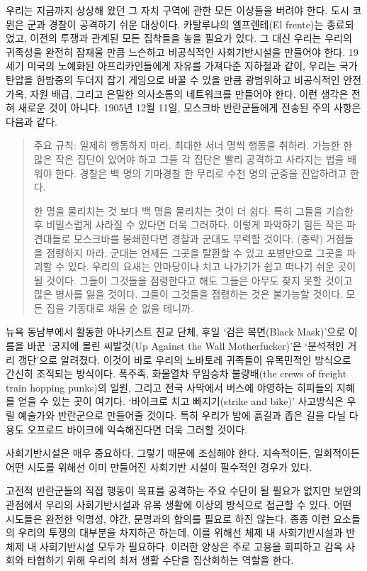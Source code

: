 \documentclass[10pt, b6paper, openany]{memoir}
\begin{document}
\begin{article}
우리는 지금까지 상상해 왔던 그 자치 구역에 관한 모든 이상들을 버려야 한다. 도시 코뮌은 군과 경찰이 공격하기 쉬운 대상이다. 카탈루냐의 엘프렌테(El frente)는 종료되었고, 이전의 투쟁과 관계된 모든 집착들을 놓을 필요가 있다. 그 대신 우리는 우리의 귀족성을 완전히 잠재울 만큼 느슨하고 비공식적인 사회기반시설을 만들어야 한다. 19세기 미국의 노예화된 아프리카인들에게 자유를 가져다준 지하철과 같이, 우리는 국가 탄압을 한밤중의 두더지 잡기 게임으로 바꿀 수 있을 만큼 광범위하고 비공식적인 안전가옥, 자원 배급, 그리고 은밀한 의사소통의 네트워크를 만들어야 한다. 이런 생각은 전혀 새로운 것이 아니다. 1905년 12월 11일, 모스크바 반란군들에게 전송된 주의 사항은 다음과 같다. 

\begin{quote}
주요 규칙: 일제히 행동하지 마라. 최대한 서너 명씩 행동을 취하라. 가능한 한 많은 작은 집단이 있어야 하고 그들 각 집단은 빨리 공격하고 사라지는 법을 배워야 한다. 경찰은 백 명의 기마경찰 한 무리로 수천 명의 군중을 진압하려고 한다.

한 명을 물리치는 것 보다 백 명을 물리치는 것이 더 쉽다. 특히 그들을 기습한 후 비밀스럽게 사라질 수 있다면 더욱 그러하다. 이렇게 파악하기 힘든 작은 파견대들로 모스크바를 봉쇄한다면 경찰과 군대도 무력할 것이다. (중략) 거점들을 점령하지 마라. 군대는 언제든 그곳을 탈환할 수 있고 포병만으로 그곳을 파괴할 수 있다. 우리의 요새는 안마당이나 치고 나가기가 쉽고 떠나기 쉬운 곳이 될 것이다. 그들이 그것들을 점령한다고 해도 그들은 아무도 찾지 못할 것이고 많은 병사를 잃을 것이다. 그들이 그것들을 점령하는 것은 불가능할 것이다. 모든 집을 기동대로 채울 순 없을 테니까. 
\end{quote}

뉴욕 동남부에서 활동한 아나키스트 친교 단체, 후일 `검은 복면(Black Mask)'으로 이름을 바꾼 `궁지에 몰린 씨발것(Up Against the Wall Motherfucker)'은 `분석적인 거리 갱단'으로 알려졌다. 이것이 바로 우리의 노바토레 귀족들이 유목민적인 방식으로 간신히 조직되는 방식이다. 폭주족, 화물열차 무임승차 불량배(the crews of freight train hopping punks)의 일원, 그리고 전국 사막에서 버스에 야영하는 히피들의 지혜를 얻을 수 있는 곳이 여기다. `바이크로 치고 빠지기(strike and bike)' 사고방식은 우릴 예술가와 반란군으로 만들어줄 것이다. 특히 우리가 밤에 흙길과 좁은 길을 다닐 다용도 오프로드 바이크에 익숙해진다면 더욱 그러할 것이다. 

사회기반시설은 매우 중요하다, 그렇기 때문에 조심해야 한다. 지속적이든, 일회적이든 어떤 시도를 위해선  이미 만들어진 사회기반 시설이 필수적인 경우가 있다.

고전적 반란군들의 직접 행동이 목표를 공격하는 주요 수단이 될 필요가 없지만 보안의 관점에서 우리의 사회기반시설과 유목 생활에 이상의 방식으로 접근할 수 있다. 어떤 시도들은 완전한 익명성, 야간, 문명과의 합의를 필요로 하진 않는다. 종종 이런 요소들의 우리의 투쟁의 대부분을 차지하곤 하는데, 이를 위해선 체제 내 사회기반시설과 반 체제 내 사회기반시설 모두가 필요하다. 이러한 양상은 주로 고용을 회피하고 감옥 사회와 타협하기 위해 우리의 최저 생활 수단을 집산화하는 역할을 한다.


\end{article}
\end{document}

